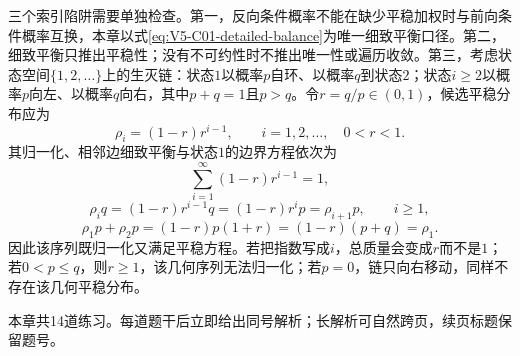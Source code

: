 \label{struct:V5-C01-CH34}
\begin{warningbox}
三个索引陷阱需要单独检查。第一，反向条件概率不能在缺少平稳加权时与前向条件概率互换，本章以式\eqref{eq:V5-C01-detailed-balance}为唯一细致平衡口径。第二，细致平衡只推出平稳性；没有不可约性时不推出唯一性或遍历收敛。第三，考虑状态空间$\{1,2,\ldots\}$上的生灭链：状态$1$以概率$p$自环、以概率$q$到状态$2$；状态$i\ge2$以概率$p$向左、以概率$q$向右，其中$p+q=1$且$p>q$。令$r=q/p\in(0,1)$，候选平稳分布应为
\[
\rho_i=(1-r)r^{i-1},\qquad i=1,2,\ldots,\quad0<r<1.
\]
其归一化、相邻边细致平衡与状态$1$的边界方程依次为
\[
\sum_{i=1}^{\infty}(1-r)r^{i-1}=1,
\]
\[
\rho_iq=(1-r)r^{i-1}q
=(1-r)r^ip=\rho_{i+1}p,
\qquad i\ge1,
\]
\[
\rho_1p+\rho_2p=(1-r)p(1+r)
=(1-r)(p+q)=\rho_1.
\]
因此该序列既归一化又满足平稳方程。若把指数写成$i$，总质量会变成$r$而不是$1$；若$0<p\le q$，则$r\ge1$，该几何序列无法归一化；若$p=0$，链只向右移动，同样不存在该几何平稳分布。
\end{warningbox}

\nopagebreak[4]

\begin{chapterexercisebox}
\label{struct:V5-C01-CH35}
本章共14道练习。每道题干后立即给出同号解析；长解析可自然跨页，续页标题保留题号。
\end{chapterexercisebox}

